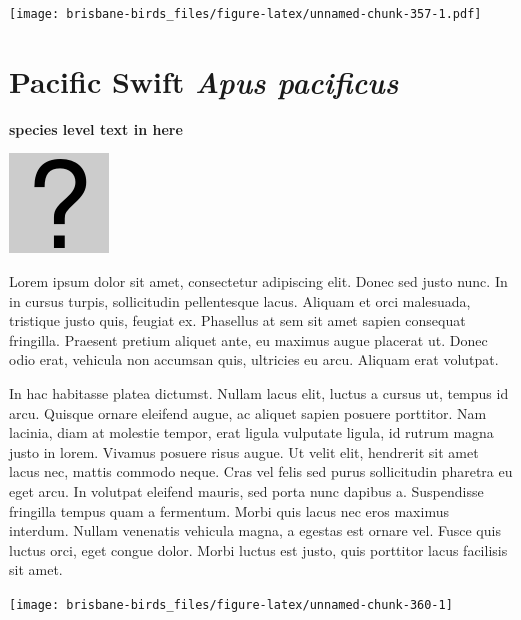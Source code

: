 \documentclass[]{book}
\let\origfigure\figure
\let\endorigfigure\endfigure
\renewenvironment{figure}[1][2] {
  \expandafter\origfigure\expandafter[H]
} {
  \endorigfigure
}
\begin{document}
\begin{figure}
\centering
\texttt{[image: brisbane-birds\_files/figure-latex/unnamed-chunk-357-1.pdf]}
\caption{\label{fig:unnamed-chunk-357}insert figure caption}
\end{figure}

\section{\texorpdfstring{Pacific Swift \emph{Apus
pacificus}}{Pacific Swift Apus pacificus}}\label{pacific-swift-apus-pacificus}

\textbf{species level text in here}

\begin{figure}
\centering
\includegraphics{assets/missing.png}
\caption{No image for species}
\end{figure}

Lorem ipsum dolor sit amet, consectetur adipiscing elit. Donec sed justo
nunc. In in cursus turpis, sollicitudin pellentesque lacus. Aliquam et
orci malesuada, tristique justo quis, feugiat ex. Phasellus at sem sit
amet sapien consequat fringilla. Praesent pretium aliquet ante, eu
maximus augue placerat ut. Donec odio erat, vehicula non accumsan quis,
ultricies eu arcu. Aliquam erat volutpat.

In hac habitasse platea dictumst. Nullam lacus elit, luctus a cursus ut,
tempus id arcu. Quisque ornare eleifend augue, ac aliquet sapien posuere
porttitor. Nam lacinia, diam at molestie tempor, erat ligula vulputate
ligula, id rutrum magna justo in lorem. Vivamus posuere risus augue. Ut
velit elit, hendrerit sit amet lacus nec, mattis commodo neque. Cras vel
felis sed purus sollicitudin pharetra eu eget arcu. In volutpat eleifend
mauris, sed porta nunc dapibus a. Suspendisse fringilla tempus quam a
fermentum. Morbi quis lacus nec eros maximus interdum. Nullam venenatis
vehicula magna, a egestas est ornare vel. Fusce quis luctus orci, eget
congue dolor. Morbi luctus est justo, quis porttitor lacus facilisis sit
amet.

\begin{figure}
\texttt{[image: brisbane-birds\_files/figure-latex/unnamed-chunk-360-1]} \caption{insert figure caption}\label{fig:unnamed-chunk-360}
\end{figure}
\end{document}
